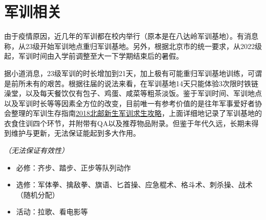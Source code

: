 \section{军训相关}


由于疫情原因，近几年的军训都在校内举行（原本是在八达岭军训基地）。有消息称，从23级开始军训地点重归军训基地。另外，根据北京市的统一要求，从2022级起，军训时间由入学前调整至大一下学期结束后的暑假。


据小道消息，23级军训的时长增加到21天，加上极有可能重归军训基地训练，可谓是前所未有的艰苦。根据往届的说法来看，在军训基地14天只能体验3次限时铁链澡堂，以及每天餐饮仅有包子、鸡蛋、咸菜等粗茶淡饭。鉴于军训时间、军训地点以及军训时长等等因素全方位的改变，目前唯一有参考价值的是往年军事爱好者协会整理的军训生存指南\href{https://shimo.im/docs/473QMD0rGVc6MV3w/}{2018北邮新生军训求生攻略}，上面详细地记录了军训基地的衣食住训四个环节，并附带有QA以及推荐物品附录。但鉴于年代久远，长期未得到维护与更新，无法保证能起到多大作用。


\emph{（无法保证有效性）}
\begin{itemize}
    \item 必修：齐步、踏步、正步等队列动作
    \item 选修：军体拳、擒敌拳、旗语、匕首操、应急棍术、格斗术、刺杀操、战术（随机分配）
    \item 活动：拉歌、看电影等
\end{itemize}
